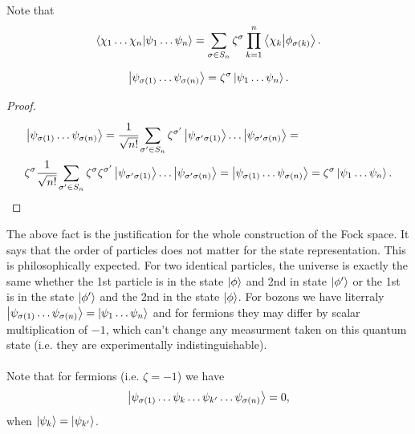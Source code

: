 \documentclass[main.tex]{subfiles}
\begin{document}
Note that
\begin{equation}
\bra{\chi_1\dots\chi_n} \ket{\psi_1 \dots \psi_n} =
 \sum_{\sigma\in S_n}  \zeta^\sigma
\prod_{k=1}^n \bra{\chi_{k}}\ket{\phi_{\sigma(k)}}.
\end{equation}

\begin{fact}
\begin{equation}
\label{fock-justification}
\ket{\psi_{\sigma(1)} \dots \psi_{\sigma(n)}} = \zeta^\sigma \ket{\psi_1 \dots \psi_n}.
\end{equation}
\end{fact}
\begin{proof}
\begin{align*}
&\ket{\psi_{\sigma(1)} \dots \psi_{\sigma(n)}} = \cfrac{1}{\sqrt{n!}}\sum_{\sigma'\in S_n} \zeta^{\sigma'} 
\ket{\psi_{\sigma'\sigma(1)}} \dots \ket{\psi_{\sigma'\sigma(n)}} = \\
& \zeta^\sigma \cfrac{1}{\sqrt{n!}}\sum_{\sigma'\in S_n}\zeta^\sigma \zeta^{\sigma'} 
\ket{\psi_{\sigma'\sigma(1)}} \dots \ket{\psi_{\sigma'\sigma(n)}} = 
\ket{\psi_{\sigma(1)} \dots \psi_{\sigma(n)}} = \zeta^\sigma \ket{\psi_1 \dots \psi_n}.
\end{align*}
\end{proof}

The above fact is the justification for the whole construction of the Fock space. It says that the order of particles does not matter for the state representation. This is philosophically expected. For two identical particles, the universe is exactly the same whether the 1st particle is in the state $\ket{\phi}$ and 2nd in state $\ket{\phi'}$ or the 1st is in the state $\ket{\phi'}$ and the 2nd in the state $\ket{\phi}$. For bozons we have literraly $\ket{\psi_{\sigma(1)} \dots \psi_{\sigma(n)}} = \ket{\psi_1 \dots \psi_n}$ and for fermions they may differ by scalar multiplication of $-1$, which can't change any measurment taken on this quantum state (i.e. they are experimentally indistinguishable). 

\paragraph{}
Note that for fermions (i.e. $\zeta = -1$) we have
\begin{equation}
\label{pauli-exclusion}
\ket{\psi_{\sigma(1)} \dots \psi_k \dots \psi_{k'} \dots \psi_{\sigma(n)}} = 0,
\end{equation}
when $\ket{\psi_k} = \ket{\psi_{k'}}$.
\end{document}
